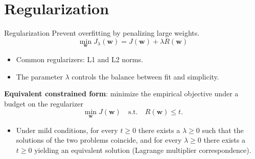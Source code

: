 \documentclass[serif, aspectratio=169]{beamer}
\begin{document}
\section{Regularization}
\begin{frame}{Regularization}
     Prevent overfitting by penalizing large weights.
    \[
    \min_{\mathbf{w}} J_{\lambda}(\mathbf{w}) = J(\mathbf{w}) + \lambda R(\mathbf{w})
    \]
    \begin{itemize}
        \item Common regularizers: L1 and L2 norms.
        \item The parameter $\lambda$ controls the balance between fit and simplicity.
    \end{itemize}
    \textbf{Equivalent constrained form}: minimize the empirical objective under a budget on the regularizer
    \[
    \min_{\mathbf{w}}  J(\mathbf{w}) \quad \text{s.t.} \quad R(\mathbf{w}) \le t.
    \]
    \begin{itemize}
        \item Under mild conditions, for every $t \ge 0$ there exists a $\lambda \ge 0$ such that the solutions of the two problems coincide, and for every $\lambda \ge 0$ there exists a $t \ge 0$ yielding an equivalent solution (Lagrange multiplier correspondence).
    \end{itemize}
\end{frame}
\end{document}

